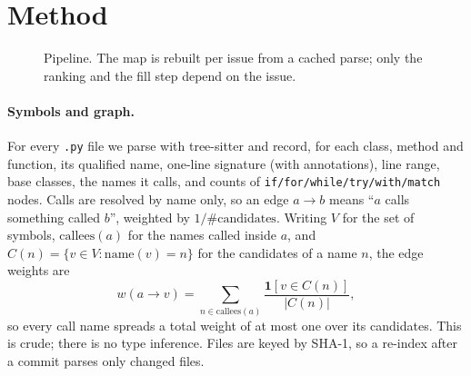 \documentclass[10pt]{article}
\newcommand{\ind}[1]{\mathbf{1}\!\left[#1\right]}
\begin{document}
\section{Method}\label{sec:method}
\begin{figure}[t]\centering
{}
\caption{Pipeline. The map is rebuilt per issue from a cached parse; only the ranking and the fill step depend on the issue.}\label{fig:pipe}
\end{figure}

\paragraph{Symbols and graph.} For every \texttt{.py} file we parse with tree-sitter \cite{ts} and record, for each class, method and function, its qualified name, one-line signature (with annotations), line range, base classes, the names it calls, and counts of \texttt{if/for/while/try/with/match} nodes. Calls are resolved by name only, so an edge $a\to b$ means ``$a$ calls something called $b$'', weighted by $1/\#\text{candidates}$. Writing $V$ for the set of symbols, $\mathrm{callees}(a)$ for the names called inside $a$, and $C(n)=\{v\in V:\mathrm{name}(v)=n\}$ for the candidates of a name $n$, the edge weights are
\begin{equation}\label{eq:w}
w(a\to v)=\sum_{n\in\mathrm{callees}(a)}\frac{\ind{v\in C(n)}}{|C(n)|},
\end{equation}
so every call name spreads a total weight of at most one over its candidates. This is crude; there is no type inference. Files are keyed by SHA-1, so a re-index after a commit parses only changed files.
\end{document}

